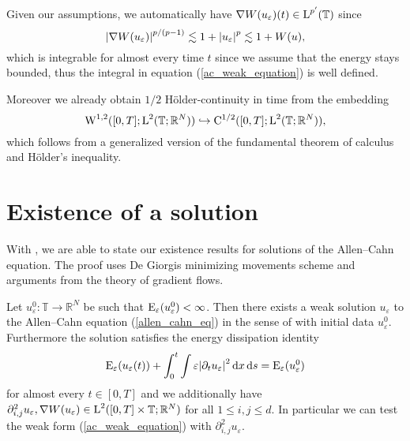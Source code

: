 \begin{remark}
	Given our assumptions, we automatically have $ \nabla W ( u_{ \varepsilon } ) ( t ) \in \operatorname{L}^{ p' } ( \mathbb{ T } ) $ since
	\begin{equation}
		\abs{ \nabla W ( u_{ \varepsilon} ) }^{ p/(p-1) }
		\lesssim
		1+ \abs{u_{ \varepsilon }}^{ p }
		\lesssim
		1 + W ( u ),
	\end{equation}
	which is integrable for almost every time $ t $ since we assume that the energy stays bounded,
	thus the integral in equation (\ref{ac_weak_equation}) is well defined.
	
	Moreover we already obtain $ 1/2 $ Hölder-continuity in time from the embedding
	\begin{equation}
		\operatorname{W}^{ 1 , 2} ( [ 0 , T ] ; \operatorname{L}^{ 2 } ( \mathbb{ T };\mathbb{ R }^{ N } ) )
		\hookrightarrow
		\mathrm{ C }^{ 1/2 } ( [ 0 , T ] ; \operatorname{L}^{ 2 } ( \mathbb{ T } ; \mathbb{ R }^{ N } ) ),
	\end{equation}
	which follows from a generalized version of the fundamental theorem of calculus and Hölder's inequality.
\end{remark}

\section{Existence of a solution}

With , we are able to state our existence results for solutions of the Allen--Cahn equation. The proof uses De Giorgis minimizing movements scheme and arguments from the theory of gradient flows.

\begin{theorem}
	\label{existence_of_ac_solution}
	Let $ u_{ \varepsilon}^{ 0 } \colon \mathbb{ T } \to \mathbb{ R }^{ N } $ be such that 
	$ \operatorname{E}_{ \varepsilon } ( u_{ \varepsilon}^{ 0 } ) < \infty $.
	Then there exists a weak solution $ u_{ \varepsilon} $ to the Allen--Cahn equation (\ref{allen_cahn_eq}) in the sense of  with initial data $ u_{ \varepsilon}^{ 0 } $.
	Furthermore the solution satisfies the energy dissipation identity
	\begin{equation}
		\operatorname{E}_{ \varepsilon } ( u_{ \varepsilon } ( t ) )
		+
		\int_{ 0 }^{ t }
			\int
				\varepsilon \abs{ \partial_{ t } u_{ \varepsilon } }^{ 2 }
			\dd{ x }
		\dd{ s }
		=
		\operatorname{E}_{ \varepsilon } ( u_{ \varepsilon}^{ 0 } )
	\end{equation}
	for almost every $ t \in [ 0 , T ] $ and we additionally have
	$
		\partial_{ i , j }^{ 2 } u_{ \varepsilon }, \nabla W ( u_{ \varepsilon } ) \in \operatorname{L}^{ 2 } ( [0, T] \times \mathbb{ T } ; \mathbb{ R }^{ N } ) 
	$
	for all $ 1 \leq i, j \leq d $. In particular we can test the weak form (\ref{ac_weak_equation}) with $ \partial_{ i , j }^{ 2 } u_{ \varepsilon } $.
\end{theorem}







